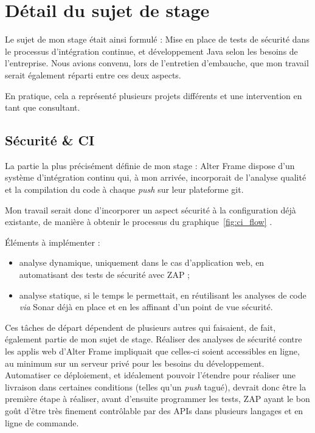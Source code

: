 \section{Détail du sujet de stage}
\label{sec:sujet}
Le sujet de mon stage était ainsi formulé : \og Mise en place de tests de sécurité dans le processus d'intégration continue, et développement Java selon les besoins de l'entreprise.\fg{}  Nous avions convenu, lors de l'entretien d'embauche, que mon travail serait également réparti entre ces deux aspects.

En pratique, cela a représenté plusieurs projets différents et une intervention en tant que consultant.

\subsection{Sécurité \& CI}
La partie la plus précisément définie de mon stage : Alter Frame dispose d'un système d'intégration continu qui, à mon arrivée, incorporait de l'analyse qualité et la compilation du code à chaque \textit{push} sur leur plateforme git.

Mon travail serait donc d'incorporer un aspect sécurité à la configuration déjà existante, de manière à obtenir le processus du graphique~\ref{fig:ci_flow} .

Éléments à implémenter :
\begin{itemize}
	\item analyse dynamique, uniquement dans le cas d'application web, en automatisant des tests de sécurité avec ZAP ;
	\item analyse statique, si le temps le permettait, en réutilisant les analyses de code \textit{via} Sonar déjà en place et en les affinant d'un point de vue sécurité.
\end{itemize}
Ces tâches de départ dépendent de plusieurs autres qui faisaient, de fait, également partie de mon sujet de stage. Réaliser des analyses de sécurité contre les applis web d'Alter Frame impliquait que celles-ci soient accessibles en ligne, au minimum sur un serveur privé pour les besoins du développement. Automatiser ce déploiement, et idéalement pouvoir l'étendre pour réaliser une livraison dans certaines conditions (telles qu'un \textit{push} tagué), devrait donc être la première étape à réaliser, avant d'ensuite programmer les tests, ZAP ayant le bon goût d'être très finement contrôlable par des APIs dans plusieurs langages\cite{zap_api} et en ligne de commande\cite{zap_cli}\cite{zap_cli_wrapper}.

